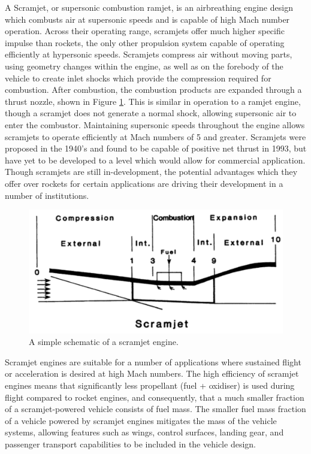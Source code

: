   
  A Scramjet, or supersonic combustion ramjet, is an airbreathing engine design which combusts air at supersonic speeds and is capable of high Mach number operation. 
      Across their operating range, scramjets offer much higher specific impulse than rockets, the only other propulsion system capable of operating efficiently at hypersonic speeds\cite{Billig1993,Cook2003}.
        Scramjets compress air without moving parts, using geometry changes within the engine\cite{Curran2001a}, as well as on the forebody of the vehicle to create inlet shocks which provide the compression required for combustion\cite{Smart2012}. After combustion, the combustion products are expanded through a thrust nozzle, shown in Figure \ref{fig:scramjet}. This is similar in operation to a ramjet engine, though a scramjet does not generate a normal shock, allowing supersonic air to enter the combustor. Maintaining supersonic speeds throughout the engine allows scramjets to operate efficiently at Mach numbers of 5 and greater. 
        Scramjets were proposed in the 1940's\cite{Curran2001} and found to be capable of positive net thrust in 1993\cite{Paull1993}, but have yet to be developed to a level which would allow for commercial application. 
        Though scramjets are still in-development, the potential advantages which they offer over rockets for certain applications are driving their development in a number of institutions\cite{Curran2001b}.
   \begin{figure}[ht]
   	\centering
   	\includegraphics[width=0.7\linewidth]{figures/2_literature-review/scramjet}
   	\caption{A simple schematic of a scramjet engine\cite{Heiser1994}.}
   	\label{fig:scramjet}
   \end{figure}
   
   Scramjet engines are suitable for a number of applications where sustained flight or acceleration is desired at high Mach numbers. 
   The high efficiency of scramjet engines means that significantly less propellant (fuel + oxidiser) is used during flight compared to rocket engines, and consequently, that a much smaller fraction of a scramjet-powered vehicle consists of fuel mass\cite{Curran2003}. 
   The smaller fuel mass fraction of a vehicle powered by scramjet engines mitigates the mass of the vehicle systems, allowing features such as wings, control surfaces, landing gear, and passenger transport capabilities to be included in the vehicle design\cite{Curran2003}. 
   
